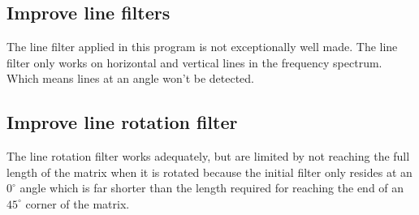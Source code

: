\subsection{Improve line filters}
	The line filter applied in this program is not exceptionally well made. The
	line filter only works on horizontal and vertical lines in the frequency
	spectrum.  Which means lines at an angle won't be detected.

\subsection{Improve line rotation filter}
	The line rotation filter works adequately, but are limited by not reaching the
full length of the matrix when it is rotated because the initial filter only
resides at an $0^\circ$ angle which is far shorter than the length required for
reaching the end of an $45^\circ$ corner of the matrix.


